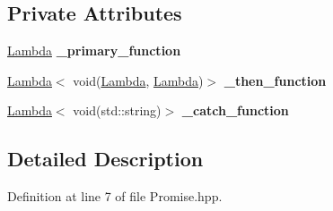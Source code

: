 \subsection*{Private Attributes}
\begin{DoxyCompactItemize}
\item 
\hyperlink{class_threading_1_1_lambda}{Lambda} {\bfseries \+\_\+primary\+\_\+function}\hypertarget{class_threading_1_1_promise_a8af5df617c8285a8481a1c96a9233591}{}\label{class_threading_1_1_promise_a8af5df617c8285a8481a1c96a9233591}

\item 
\hyperlink{class_threading_1_1_lambda}{Lambda}$<$ void(\hyperlink{class_threading_1_1_lambda}{Lambda}, \hyperlink{class_threading_1_1_lambda}{Lambda})$>$ {\bfseries \+\_\+then\+\_\+function}\hypertarget{class_threading_1_1_promise_a9746cd2fc6d98afbe8ac3567673b3b9a}{}\label{class_threading_1_1_promise_a9746cd2fc6d98afbe8ac3567673b3b9a}

\item 
\hyperlink{class_threading_1_1_lambda}{Lambda}$<$ void(std\+::string)$>$ {\bfseries \+\_\+catch\+\_\+function}\hypertarget{class_threading_1_1_promise_aacf54b6543861a8676bb1075d443f538}{}\label{class_threading_1_1_promise_aacf54b6543861a8676bb1075d443f538}

\end{DoxyCompactItemize}


\subsection{Detailed Description}


Definition at line 7 of file Promise.\+hpp.

